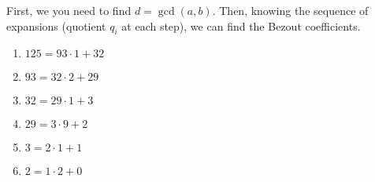 \documentclass[../lecture-notes-148x210.tex]{subfiles}
\begin{document}
\begin{example} 
    \hfill

    First, we you need to find $d = \gcd(a,b)$. Then, knowing the sequence of
    expansions (quotient $q_i$ at each step), we can find the Bezout
    coefficients. 

    \hfill

    \begin{minipage}{0.35\textwidth}
        \raggedright
        \vspace*{\fill}
            \begin{enumerate}
                \item $125 = 93 \cdot 1 + 32$
                \item $93 = 32 \cdot 2 + 29$
                \item $32 = 29 \cdot 1 + 3$
                \item $29 = 3 \cdot 9 + 2$
                \item $3 = 2 \cdot 1 + 1$
                \item $2 = 1 \cdot 2 + 0$        
            \end{enumerate}
        \vspace*{\fill}
    \end{minipage}
    \begin{minipage}{0.75\textwidth}
\end{minipage}
\end{example}
\end{document}
